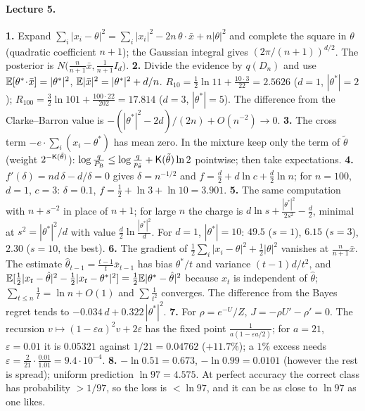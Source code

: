 \paragraph{Lecture 5.}
\textbf{1.} Expand $\sum_i|x_i-\theta|^2=\sum_i|x_i|^2-2n\,\theta\!\cdot\!\bar x+n|\theta|^2$ and complete the square in $\theta$ (quadratic coefficient $n+1$); the Gaussian integral gives $(2\pi/(n+1))^{d/2}$. The posterior is $N\big(\frac n{n+1}\bar x,\frac1{n+1}I_d\big)$. \quad
\textbf{2.} Divide the evidence by $q(D_n)$ and use $\mathbb{E}[\theta^*\!\cdot\!\bar x]=|\theta^*|^2$, $\mathbb{E}|\bar x|^2=|\theta^*|^2+d/n$. $R_{10}=\frac12\ln11+\frac{10\cdot3}{22}=2.5626$ ($d=1$, $|\theta^*|=2$); $R_{100}=\frac32\ln101+\frac{100\cdot22}{202}=17.814$ ($d=3$, $|\theta^*|=5$). The difference from the Clarke--Barron value is $-(|\theta^*|^2-2d)/(2n)+O(n^{-2})\to0$. \quad
\textbf{3.} The cross term $-e\cdot\sum_i(x_i-\theta^*)$ has mean zero. In the mixture keep only the term of $\tilde\theta$ (weight $2^{-\mathsf{K}(\tilde\theta)}$): $\log\frac q{P_{\mathrm{B}}}\le\log\frac q{p_{\tilde\theta}}+\mathsf{K}(\tilde\theta)\ln2$ pointwise; then take expectations. \quad
\textbf{4.} $f'(\delta)=nd\,\delta-d/\delta=0$ gives $\delta=n^{-1/2}$ and $f=\frac d2+d\ln c+\frac d2\ln n$; for $n=100$, $d=1$, $c=3$: $\delta=0.1$, $f=\frac12+\ln3+\ln10=3.901$. \quad
\textbf{5.} The same computation with $n+s^{-2}$ in place of $n+1$; for large $n$ the charge is $d\ln s+\frac{|\theta^*|^2}{2s^2}-\frac d2$, minimal at $s^2=|\theta^*|^2/d$ with value $\frac d2\ln\frac{|\theta^*|^2}d$. For $d=1$, $|\theta^*|=10$: $49.5$ ($s=1$), $6.15$ ($s=3$), $2.30$ ($s=10$, the best). \quad
\textbf{6.} The gradient of $\frac12\sum_i|x_i-\theta|^2+\frac12|\theta|^2$ vanishes at $\frac n{n+1}\bar x$. The estimate $\hat\theta_{t-1}=\frac{t-1}t\bar x_{t-1}$ has bias $\theta^*/t$ and variance $(t-1)d/t^2$, and $\mathbb{E}[\frac12|x_t-\hat\theta|^2-\frac12|x_t-\theta^*|^2]=\frac12\mathbb{E}|\theta^*-\hat\theta|^2$ because $x_t$ is independent of $\hat\theta$; $\sum_{t\le n}\frac1t=\ln n+O(1)$ and $\sum\frac1{t^2}$ converges. The difference from the Bayes regret tends to $-0.034\,d+0.322\,|\theta^*|^2$. \quad
\textbf{7.} For $\rho=e^{-U}/Z$, $J=-\rho U'-\rho'=0$. The recursion $v\mapsto(1-\varepsilon a)^2v+2\varepsilon$ has the fixed point $\frac1{a(1-\varepsilon a/2)}$; for $a=21$, $\varepsilon=0.01$ it is $0.05321$ against $1/21=0.04762$ ($+11.7\%$); a $1\%$ excess needs $\varepsilon=\frac2{21}\cdot\frac{0.01}{1.01}=9.4\cdot10^{-4}$. \quad
\textbf{8.} $-\ln0.51=0.673$, $-\ln0.99=0.0101$ (however the rest is spread); uniform prediction $\ln97=4.575$. At perfect accuracy the correct class has probability $>1/97$, so the loss is $<\ln97$, and it can be as close to $\ln97$ as one likes. \quad
